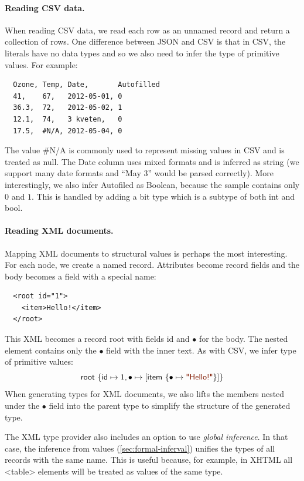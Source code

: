 \documentclass[10pt,preprint,blind,clearpagebib]{sigplanconf}
\newcommand{\kvd}[1]{\textnormal{\textcolor{kvdclr}{\sffamily #1}}}
\newcommand{\str}[1]{\textnormal{\textcolor{strclr}{\sffamily "#1"}}}
\newcommand{\ident}[1]{\textnormal{\sffamily #1}}
\begin{document}
\paragraph{Reading CSV data.}
When reading CSV data, we read each row as an unnamed record and return a collection of rows.
One difference between JSON and CSV is that in CSV, the literals have no data types and so 
we also need to infer the type of primitive values. For example:
%
{\small{
\begin{verbatim}
  Ozone, Temp, Date,       Autofilled
  41,    67,   2012-05-01, 0
  36.3,  72,   2012-05-02, 1
  12.1,  74,   3 kveten,   0
  17.5,  #N/A, 2012-05-04, 0
\end{verbatim}
}}
%
\noindent
The value {\small\ttfamily \#N/A} is commonly used to represent missing values in CSV and is treated
as \kvd{null}. The \ident{Date} column uses mixed formats and is inferred as \ident{string} 
(we support many date formats and ``May 3'' would be parsed correctly). More interestingly,
we also infer \ident{Autofiled} as Boolean, because the sample contains only $0$ and $1$.
This is handled by adding a \ident{bit} type which is a subtype of both \ident{int} and \ident{bool}.

\paragraph{Reading XML documents.}
Mapping XML documents to structural values is perhaps the most interesting. For each node, we
create a named record. Attributes become record fields and the body becomes a field with a special
name:
%
{\small{
\begin{verbatim}
  <root id="1">
    <item>Hello!</item>
  </root>    
\end{verbatim}
}}
%
\noindent
This XML becomes a record \ident{root} with fields \ident{id} and $\bullet$ for the body. 
The nested element contains only the $\bullet$ field with the inner text. As with CSV, we
infer type of primitive values:
%
\begin{equation*}
\ident{root}~\{ \ident{id} \mapsto 1, \bullet \mapsto [ \ident{item}~\{ \bullet \mapsto \str{Hello!} \}] \}
\end{equation*}
%
When generating types for XML documents, we also lifts the members nested under the $\bullet$ 
field into the parent type to simplify the structure of the generated type.

The XML type provider also includes an option to use \emph{global inference}. In that case, 
the inference from values (\ref{sec:formal-inferval}) unifies the types of all records with the 
same name. This is useful because, for example, in XHTML all {\small\ttfamily <table>} elements
will be treated as values of the same type.
\end{document}
